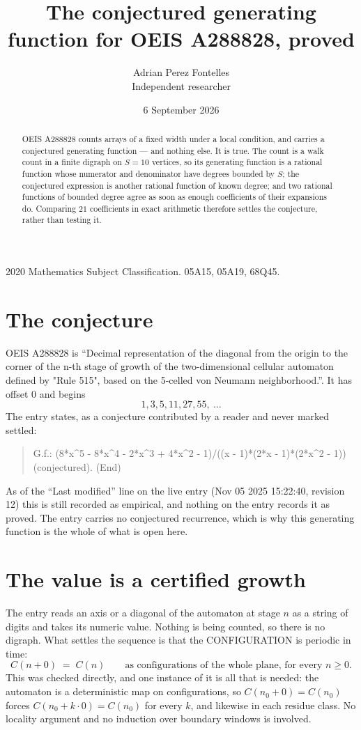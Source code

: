 \documentclass[11pt,a4paper]{article}
\title{The conjectured generating function for OEIS A288828, proved}
\author{Adrian Perez Fontelles\\ \small Independent researcher}
\date{6 September 2026}
\theoremstyle{plain}
\theoremstyle{definition}
\begin{document}
\maketitle

\begin{abstract}
OEIS A288828 counts arrays of a fixed width under a local condition, and carries a conjectured
generating function --- and nothing else. It is true. The count is a walk count in a finite
digraph on $S=10$ vertices, so its generating function is a rational function whose numerator
and denominator have degrees bounded by $S$; the conjectured expression is another rational
function of known degree; and two rational functions of bounded degree agree as soon as enough
coefficients of their expansions do. Comparing $21$ coefficients in exact arithmetic
therefore settles the conjecture, rather than testing it.
\end{abstract}

\noindent\small 2020 Mathematics Subject Classification. 05A15, 05A19, 68Q45.\normalsize

\section{The conjecture}

OEIS A288828 is ``Decimal representation of the diagonal from the origin to the corner of the n-th stage of growth of the two-dimensional cellular automaton defined by "Rule 515", based on the 5-celled von Neumann neighborhood.''. It has offset $0$ and begins
\[
1, 3, 5, 11, 27, 55,\ \dots
\]
The entry states, as a conjecture contributed by a reader and never marked settled:
\begin{quote}
G.f.: (8*x\^{}5 - 8*x\^{}4 - 2*x\^{}3 + 4*x\^{}2 - 1)/((x - 1)*(2*x - 1)*(2*x\^{}2 - 1)) (conjectured). (End)
\end{quote}
As of the ``Last modified'' line on the live entry (Nov 05 2025 15:22:40, revision 12) this is still
recorded as empirical, and nothing on the entry records it as proved. The entry carries no
conjectured recurrence, which is why this generating function is the whole of what is open
here.


\section{The value is a certified growth}

The entry reads an axis or a diagonal of the automaton at stage $n$ as a string of digits and
takes its numeric value. Nothing is being counted, so there is no digraph. What settles the
sequence is that the CONFIGURATION is periodic in time:
\[
C(n+0)\;=\;C(n)\qquad\text{as configurations of the whole plane, for every } n\ge 0.
\]
This was checked directly, and one instance of it is all that is needed: the automaton is a
deterministic map on configurations, so $C(n_0+0)=C(n_0)$ forces $C(n_0+k\cdot0)=C(n_0)$ for
every $k$, and likewise in each residue class. No locality argument and no induction over
boundary windows is involved.
\end{document}
